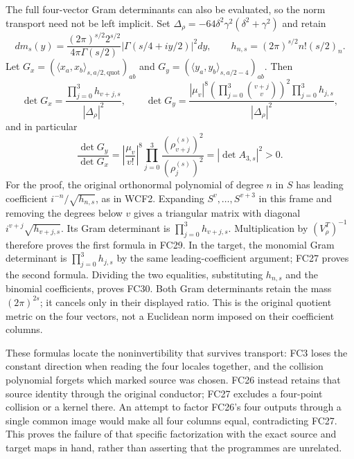 The full four-vector Gram determinants can also be evaluated, so the
norm transport need not be left implicit. Set
$\Delta_\rho=-64\delta^2\gamma^2(\delta^2+\gamma^2)$ and retain
\[
 dm_s(y)=\frac{(2\pi)^{s/2}2^{s/2}}{4\pi\Gamma(s/2)}
 |\Gamma(s/4+iy/2)|^2dy,\qquad
 h_{n,s}=(2\pi)^{s/2}n!(s/2)_n.
 \tag{FC28}
\]
Let $G_x=(\langle x_a,x_b\rangle_{s,a/2,\mathrm{quot}})_{ab}$
and $G_y=(\langle y_a,y_b\rangle_{s,a/2-4})_{ab}$. Then
\[
 \det G_x=\frac{\prod_{j=0}^3 h_{v+j,s}}{|\Delta_\rho|^2},\qquad
 \det G_y=\frac{|\mu_v|^8
       \left(\prod_{j=0}^3\binom{v+j}{v}\right)^2
       \prod_{j=0}^3h_{j,s}}{|\Delta_\rho|^2},
 \tag{FC29}
\]
and in particular
\[
 \frac{\det G_y}{\det G_x}
 =\left|\frac{\mu_v}{v!}\right|^8
       \prod_{j=0}^3\frac{(\rho_{v+j}^{(s)})^2}
                              {(\rho_j^{(s)})^2}
 =|\det A_{3,s}|^2>0.
 \tag{FC30}
\]
For the proof, the original orthonormal polynomial of degree $n$ in
$S$ has leading coefficient $i^{-n}/\sqrt{h_{n,s}}$, as in WCF2.
Expanding $S^v,\ldots,S^{v+3}$ in this frame and removing the
degrees below $v$ gives a triangular matrix with diagonal
$i^{v+j}\sqrt{h_{v+j,s}}$. Its Gram determinant is
$\prod_{j=0}^3h_{v+j,s}$. Multiplication by $(V_\rho^T)^{-1}$
therefore proves the first formula in FC29. In the target, the
monomial Gram determinant is $\prod_{j=0}^3h_{j,s}$ by the same
leading-coefficient argument; FC27 proves the second formula.
Dividing the two equalities, substituting $h_{n,s}$ and the binomial
coefficients, proves FC30. Both Gram determinants retain the mass
$(2\pi)^{2s}$; it cancels only in their displayed ratio. This is the
original quotient metric on the four vectors, not a Euclidean norm
imposed on their coefficient columns.

These formulas locate the noninvertibility that survives transport:
FC3 loses the constant direction when reading the four locales together,
and the collision polynomial forgets which marked source was chosen.
FC26 instead retains that source identity through the original
conductor; FC27 excludes a four-point collision or a kernel there.
An attempt to factor FC26's four outputs through a single common image
would make all four columns equal, contradicting FC27. This proves the
failure of that specific factorization with the exact source and target
maps in hand, rather than asserting that the programmes are unrelated.

